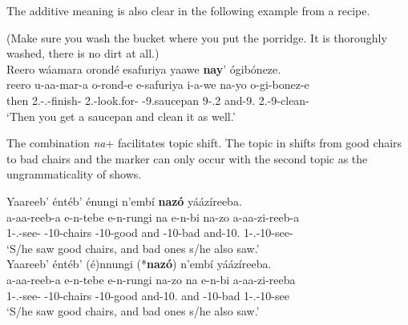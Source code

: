 \documentclass[output=paper]{langscibook}
\begin{document}
\z

The additive meaning is also clear in the following example from a recipe.

\ea
(Make sure you wash the bucket where you put the porridge. It is thoroughly washed, there is no dirt at all.)\\
Reero wáamara orondé esafuriya yaawe \textbf{nay}’ ógibóneze.\\
\gll
reero  u-aa-mar-a  o-rond-e  e-safuriya    i-a-we  na-yo  o-gi-bonez-e\\
then  2\SG{}.\SM{}-\N{}.\PST{}-finish-\FV{}  2\SG{}.\SM{}-look.for-\SBJV{}  \AUG{}-9.saucepan  9-\POSS{}.2\SG{}  and-9.\PRO{}  2\SG{}.\SM{}-9\OM{}-clean-\SBJV{}\\
\glt ‘Then you get a saucepan and clean it as well.’\\


\z

The combination \textit{na}+\PRO{} facilitates topic shift. The topic in  shifts from good chairs to bad chairs and the marker can only occur with the second topic as the ungrammaticality of  shows.

\ea
\label{bkm:Ref111488233}
\ea
\label{bkm:Ref111488233:a}
Yaareeb’ éntéb’ énungi n’embí \textbf{nazó} yáázíreeba.\\
\gll
a-aa-reeb-a  e-n-tebe  e-n-rungi  na e-n-bi  na-zo  a-aa-zi-reeb-a \\
1\SM{}-\N{}.\PST{}-see-\FV{}  \AUG{}-10-chairs  \AUG{}-10-good  and \AUG{}-10-bad  and-10.\PRO{}  1\SM{}-\N{}.\PST{}-10\OM{}-see-\FV{} \\
\glt
‘S/he saw good chairs, and bad ones s/he also saw.’\\

\ex
\label{bkm:Ref111488233:b}
Yaareeb’ éntéb’ (é)nnungi (*\textbf{nazó}) n’embí yáázíreeba.\\
\gll
a-aa-reeb-a  e-n-tebe  e-n-rungi   na-zo  na     e-n-bi  a-aa-zi-reeba \\
1\SM{}-\N{}.\PST{}-see-\FV{}  \AUG{}-10-chairs  \AUG{}-10-good   and-10.\PRO{}  and \AUG{}-10-bad  1\SM{}-\N{}.\PST{}-10\OM{}-see \\
\glt
‘S/he saw good chairs, and bad ones s/he also saw.’\\
\end{document}

